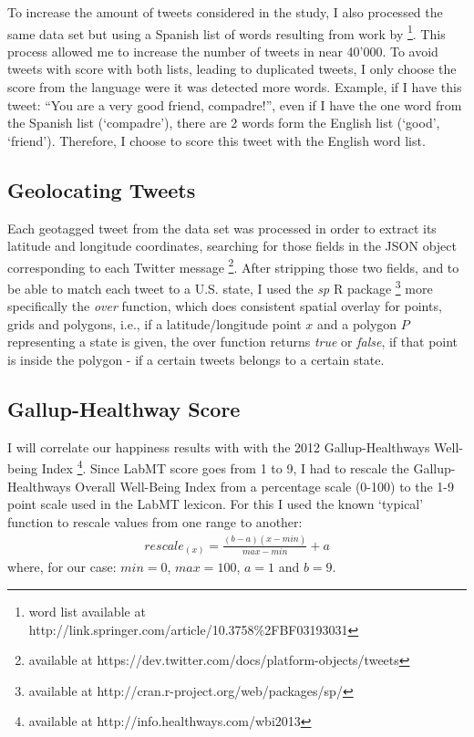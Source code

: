 \documentclass{llncs}
\begin{document}
To increase the amount of tweets considered in the study, I also processed the same data set but using a Spanish list of words resulting from work by \cite{Redondo2007} \footnote{word list available at http://link.springer.com/article/10.3758\%2FBF03193031}. This process allowed me to increase the number of tweets in near 40'000. To avoid tweets with score with both lists, leading to duplicated tweets, I only choose the score from the language were it was detected more words. Example, if I have this tweet: ``You are a very good friend, compadre!'', even if I have the one word from the Spanish list (`compadre'), there are 2 words form the English list (`good', `friend'). Therefore, I choose to score this tweet with the English word list.


\subsection{Geolocating Tweets}
\label{sec:meth2}
Each geotagged tweet from the data set was processed in order to extract its latitude and longitude coordinates, searching for those
fields in the JSON object corresponding to each Twitter message \footnote{available at https://dev.twitter.com/docs/platform-objects/tweets}. After stripping those two fields, and to be able to match each tweet to a U.S. state, I used the \emph{sp} R package \footnote{available at http://cran.r-project.org/web/packages/sp/} more specifically the \emph{over} function, which does consistent spatial overlay for points, grids and polygons, i.e., if a latitude/longitude point $x$ and a polygon $P$ representing a state is given, the over function returns \emph{true} or \emph{false}, if that point is inside the polygon - if a certain tweets belongs to a certain state.


\subsection{Gallup-Healthway Score}
\label{sec:meth3}
I will correlate our happiness results with with the 2012 Gallup-Healthways Well-being Index \cite{GallupHealthway2013} \footnote{available at http://info.healthways.com/wbi2013}. Since LabMT score goes from 1 to 9, I had to rescale the Gallup-Healthways Overall Well-Being Index from a percentage scale (0-100) to the 1-9 point scale used in the LabMT lexicon. For this I used the known `typical' function to rescale values from one range to another:
\begin{align*}
rescale_(x) = \frac{(b-a)(x-min)}{max-min} + a \tag{2}\label{eq:2}
\end{align*}
where, for our case: $min = 0$, $max = 100$, $a = 1$ and $b = 9$.
\end{document}
